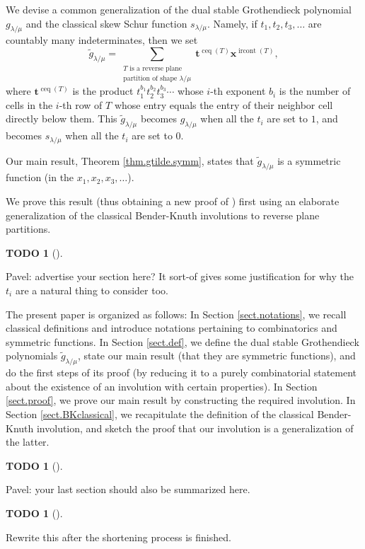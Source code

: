 \documentclass[numbers=enddot,12pt,final,onecolumn,notitlepage]{scrartcl}%
\theoremstyle{definition}
\newtheorem{quest}[theo]{TODO}
\newenvironment{todo}[1][]
{\begin{quest}[#1]\begin{leftbar}}
{\end{leftbar}\end{quest}}
\let\sumnonlimits\sum
\renewcommand{\sum}{\sumnonlimits\limits}
\begin{document}
We devise a common generalization of the dual stable Grothendieck polynomial
$g_{\lambda/\mu}$ and the classical skew Schur function $s_{\lambda/\mu}$.
Namely, if $t_{1},t_{2},t_{3},\ldots$ are countably many indeterminates, then we
set%
\[
\widetilde{g}_{\lambda/\mu}=\sum_{\substack{T\text{ is a reverse
plane}\\\text{partition of shape }\lambda/\mu}}\mathbf{t}^{\operatorname*{ceq}%
\left(  T\right)  }\mathbf{x}^{\operatorname*{ircont}\left(  T\right)  },
\]
where $\mathbf{t}^{\operatorname*{ceq}\left(  T\right)  }$ is the product
$t_{1}^{b_{1}}t_{2}^{b_{2}}t_{3}^{b_{3}}\cdots$ whose $i$-th exponent $b_{i}$
is the number of cells in the $i$-th row of $T$ whose entry equals the entry
of their neighbor cell directly below them. This $\widetilde{g}_{\lambda/\mu}$
becomes $g_{\lambda/\mu}$ when all the $t_{i}$ are set to $1$, and becomes
$s_{\lambda/\mu}$ when all the $t_{i}$ are set to $0$.

Our main result, Theorem \ref{thm.gtilde.symm}, states that
$\widetilde{g}_{\lambda/\mu}$ is a symmetric function (in the $x_{1}%
,x_{2},x_{3},\ldots$).

We prove this result (thus obtaining a new proof of \cite[Theorem 9.1]%
{LamPyl}) first using an elaborate generalization of the classical
Bender-Knuth involutions to reverse plane partitions.

\begin{todo}
Pavel: advertise your section here? It sort-of gives some justification for
why the $t_{i}$ are a natural thing to consider too.
\end{todo}

The present paper is organized as follows: In Section \ref{sect.notations}, we
recall classical definitions and introduce notations pertaining to
combinatorics and symmetric functions. In Section \ref{sect.def}, we define
the dual stable Grothendieck polynomials $\widetilde{g}_{\lambda/\mu}$, state
our main result (that they are symmetric functions), and do the first steps of
its proof (by reducing it to a purely combinatorial statement about the
existence of an involution with certain properties). In Section
\ref{sect.proof}, we prove our main result by constructing the required
involution. In Section \ref{sect.BKclassical}, we
recapitulate the definition of the classical Bender-Knuth involution, and
sketch the proof that our involution is a generalization of the latter.

\begin{todo}
Pavel: your last section should also be summarized here.
\end{todo}
\begin{todo}
Rewrite this after the shortening process is finished.
\end{todo}
\end{document}
